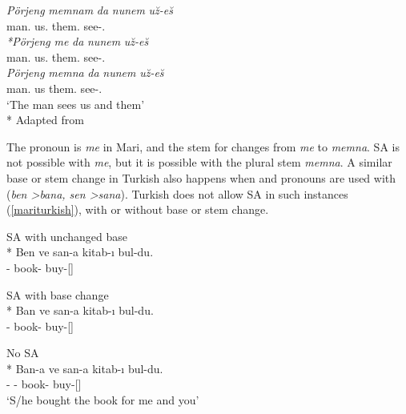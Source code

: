 \begin{exe}
 \ex \label{mariSA3}
    \begin{xlist}
        \ex \label{mariSA3a}
        \gll 
        \textit{Pörjeng} \textit{memnam} \textit{da} \textit{nunem} \textit{u\u{z}-e\u{s}} \\ man.{\Nom} us.{\Acc} {\And} them.{\Acc} see-{\Tsg}.{\Prs} \\
        
        \ex \label{mariSA3c}
        \gll 
        \textit{*Pörjeng} \textit{me} \textit{da} \textit{nunem} \textit{u\u{z}-e\u{s}} \\ man.{\Nom} us.{\Acc} {\And} them.{\Acc} see-{\Tsg}.{\Prs} \\
        
        \ex \label{mariSA3b} 
        \gll
        \textit{Pörjeng} \textit{memna} \textit{da} \textit{nunem} \textit{u\u{z}-e\u{s}} \\ man.{\Nom} us {\And} them.{\Acc} see-{\Tsg}.{\Prs} \\
        \glt `The man sees us and them'\\*
        \hfill Adapted from \cite{guseva2017postsyntactic}
    \end{xlist}
\end{exe}

The {\Fpl} pronoun is \textit{me} in Mari, and the stem for {\Acc} changes from \textit{me} to \textit{memna}. SA is not possible with \textit{me}, but it is possible with the plural stem \textit{memna}. A similar base or stem change in Turkish also happens when {\Fsg} and {\Ssg} pronouns are used with {\Dat} (\textit{ben \textgreater bana, sen \textgreater sana}). Turkish does not allow SA in such instances (\ref{mariturkish}), with or without base or stem change.

\begin{exe}
    \ex \label{mariturkish}
    \begin{xlist}
        \ex SA with unchanged base\\*
        \gll *Ben ve san-a kitab-ı bul-du. \\ 
        {\Fsg} {\And}  {\Ssg}-{\Dat} book-{\Acc} buy-{\Pst}[{\Tsg}] \\
        \glt ${}$
        
        \ex SA with base change\\*
        \gll *Ban ve san-a kitab-ı bul-du. \\ 
        {\Fsg} {\And}  {\Ssg}-{\Dat} book-{\Acc} buy-{\Pst}[{\Tsg}] \\
        \glt ${}$
        
        \ex No SA\\*
        \gll Ban-a ve san-a kitab-ı bul-du. \\ 
        {\Fsg}-{\Dat} {\And}  {\Ssg}-{\Dat} book-{\Acc} buy-{\Pst}[{\Tsg}] \\
        \glt `S/he bought the book for me and you'
    \end{xlist}
\end{exe}


